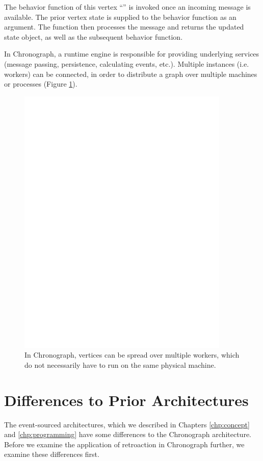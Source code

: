 The behavior function of this vertex ``'' is invoked once an incoming
message is available. The prior vertex state is supplied to the behavior function 
as an argument. The function then processes the message and returns the updated 
state object, as well as the subsequent behavior function.

In Chronograph, a runtime engine is responsible for providing underlying 
services (message passing, persistence, calculating events, etc.). Multiple 
instances (i.e. workers) can be connected, in order to distribute a graph over 
multiple machines or processes (Figure \ref{fig:chronograph}).

\begin{figure}
	\centering
	\includegraphics[page=3,width=0.9\textwidth]{../illustrations/chronograph.pdf}
	\caption{
		In Chronograph, vertices can be spread over multiple workers, which do not 
		necessarily have to run on the same physical machine.
	}
	\label{fig:chronograph}
\end{figure}

\section{Differences to Prior Architectures}
The event-sourced architectures, which we described in Chapters \ref{chp:concept}
and \ref{chp:programming} have some differences to the Chronograph architecture.
Before we examine the application of retroaction in Chronograph further, we 
examine these differences first.


